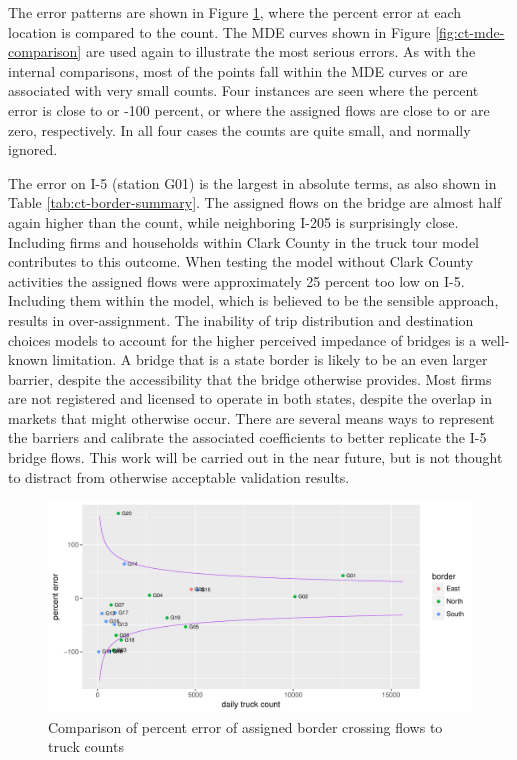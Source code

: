 The error patterns are shown in Figure \ref{fig:ct-border-mde}, where the percent error at each location is compared to the count. The MDE curves shown in Figure \ref{fig:ct-mde-comparison} are used again to illustrate the most serious errors. As with the internal comparisons, most of the points fall within the MDE curves or are associated with very small counts. Four instances are seen where the percent error is close to or -100 percent, or where the assigned flows are close to or are zero, respectively. In all four cases the counts are quite small, and normally ignored.

The error on I-5 (station G01) is the largest in absolute terms, as also shown in Table \ref{tab:ct-border-summary}. The assigned flows on the bridge are almost half again higher than the count, while neighboring I-205 is surprisingly close. Including firms and households within Clark County in the truck tour model contributes to this outcome. When testing the model without Clark County activities the assigned flows were approximately 25 percent too low on I-5. Including them within the model, which is believed to be the sensible approach, results in over-assignment. The inability of trip distribution and destination choices models to account for the higher perceived impedance of bridges is a well-known limitation. A bridge that is a state border is likely to be an even larger barrier, despite the accessibility that the bridge otherwise provides. Most firms are not registered and licensed to operate in both states, despite the overlap in markets that might otherwise occur. There are several means ways to represent the barriers and calibrate the associated coefficients to better replicate the I-5 bridge flows. This work will be carried out in the near future, but is not thought to distract from otherwise acceptable validation results.

\begin{figure}
\centering
\includegraphics[width=6.25in]{ct/BorderSummary3.pdf}
\caption{Comparison of percent error of assigned border crossing flows to truck counts}
\label{fig:ct-border-mde}
\end{figure}

